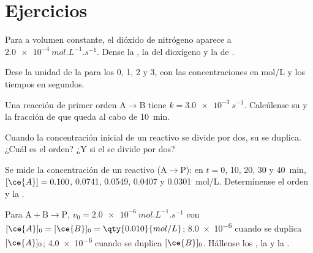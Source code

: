 \section{Ejercicios}

\begin{exercise}[$\star$]\label{exo:b1:rate-laws:1}
Para  a volumen constante, el dióxido de nitrógeno
aparece a $\qty{2.0e-4}{mol.L^{-1}.s^{-1}}$. Dense la , la  del dioxígeno y la  de .
\end{exercise}

\begin{exercise}[$\star$]\label{exo:b1:rate-laws:2}
Dese la unidad de la  para los  0,
1, 2 y 3, con las concentraciones en \unit{mol/L} y los tiempos en
segundos.
\end{exercise}

\begin{exercise}[$\star$]\label{exo:b1:rate-laws:3}
Una reacción de primer orden $\mathrm{A} \longrightarrow \mathrm{B}$ tiene
$k = \qty{3.0e-3}{s^{-1}}$. Calcúlense su  y la
fracción de  que queda al cabo de \qty{10}{min}.
\end{exercise}

\begin{exercise}[$\star$]\label{exo:b1:rate-laws:4}
Cuando la concentración inicial de un reactivo se divide por dos, su
 se duplica. ¿Cuál es el orden? ¿Y si el  se divide por dos?
\end{exercise}

\begin{exercise}[$\star\star$]\label{exo:b1:rate-laws:5}
Se mide la concentración de un reactivo  ($\mathrm{A} \longrightarrow \mathrm{P}$): en $t
= 0$, 10, 20, 30 y \qty{40}{min}, $[\ce{A}] = 0.100$, 0.0741, 0.0549,
0.0407 y \qty{0.0301}{mol/L}. Determínense el orden y la .
\end{exercise}

\begin{exercise}[$\star\star$]\label{exo:b1:rate-laws:6}
Para $\mathrm{A} + \mathrm{B} \longrightarrow \mathrm{P}$, $v_0 = \qty{2.0e-6}{mol.L^{-1}.s^{-1}}$ con $[\ce{A}]_0
= [\ce{B}]_0 = \qty{0.010}{mol/L}$; \qty{8.0e-6}{} cuando se duplica
$[\ce{A}]_0$; \qty{4.0e-6}{} cuando se duplica $[\ce{B}]_0$. Hállense los
, la  y la .
\end{exercise}

